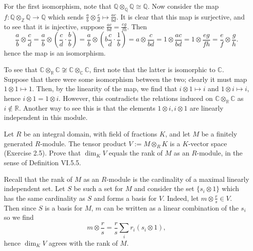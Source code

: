 \documentclass[../../master.tex]{subfiles}
\begin{document}
\begin{solution}
    For the first isomorphism, note that $\mathbb{Q} \otimes_\mathbb{Q} \mathbb{Q} \cong \mathbb{Q}$.
    Now consider the map $f : \mathbb{Q} \otimes_\mathbb{Z} \mathbb{Q} \to \mathbb{Q}$ which sends $\frac{a}{b} \otimes \frac{c}{d} \mapsto \frac{ac}{bd}$.
    It is clear that this map is surjective, and to see that it is injective, suppose $\frac{ac}{bd} = \frac{eg}{fh}$.
    Then
    \[
        \frac{a}{b} \otimes \frac{c}{d} = \frac{a}{b} \otimes \left( \frac{c}{d} \cdot \frac{b}{b} \right) = \frac{a}{b} \otimes \left(b \frac{c}{d} \cdot \frac{1}{b} \right) = a \otimes \frac{c}{bd} = 1 \otimes \frac{ac}{bd} = 1 \otimes \frac{eg}{fh} = \frac{e}{f} \otimes \frac{g}{h}.
    \] 
    hence the map is an isomorphism.

    To see that $\mathbb{C} \otimes_\mathbb{R} \mathbb{C} \not\cong \mathbb{C} \otimes_{\mathbb{C}} \mathbb{C}$, first note that the latter is isomorphic to $\mathbb{C}$.
    Suppose that there were some isomorphism between the two; clearly it must map $1 \otimes 1 \mapsto 1$.
    Then, by the linearity of the map, we find that $i \otimes 1 \mapsto i$ and $1 \otimes i \mapsto i$, hence $i \otimes 1 = 1 \otimes i$.
    However, this contradicts the relations induced on $\mathbb{C} \otimes_\mathbb{R} \mathbb{C}$ as $i \notin \mathbb{R}$.
    Another way to see this is that the elements $1 \otimes i, i \otimes 1$ are linearly independent in this module.
\end{solution}

\begin{problem}
    Let $R$ be an integral domain, with field of fractions $K$, and let $M$ be a finitely generated $R$-module.
    The tensor product $V := M \otimes_R K$ is a $K$-vector space (Exercise 2.5).
    Prove that $\dim_K V$ equals the rank of $M$ as an $R$-module, in the sense of Definition VI.5.5.
\end{problem}

\begin{solution}
    Recall that the rank of $M$ as an $R$-module is the cardinality of a maximal linearly independent set.
    Let $S$ be such a set for $M$ and consider the set $\{s_i \otimes 1\}$ which has the same cardinality as $S$ and forms a basis for $V$.
    Indeed, let $m \otimes \frac{r}{s} \in V$.
    Then since $S$ is a basis for $M$, $m$ can be written as a linear combination of the $s_i$ so we find
    \[
        m \otimes \frac{r}{s} = \frac{r}{s} \sum_{i} r_i \left( s_i \otimes 1 \right),
    \]
    hence $\dim_K V$ agrees with the rank of $M$.
\end{solution}
\end{document}

